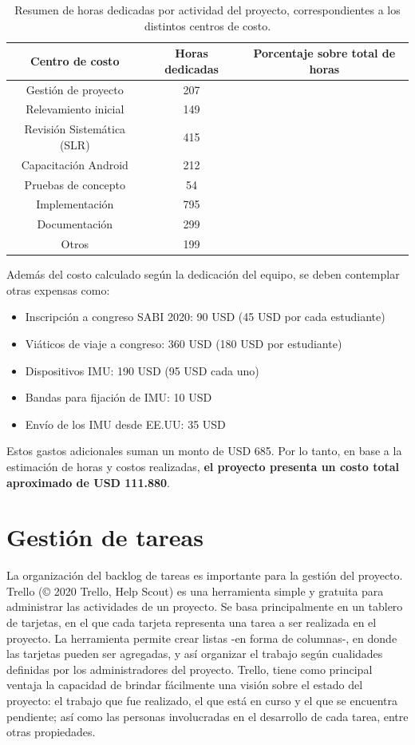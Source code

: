 \begin{table}[H]
\caption{Resumen de horas dedicadas por actividad del proyecto, correspondientes a los distintos centros de costo.}
\centering
\hspace*{-2.5cm}%
\begin{tabular}{|c|c|c|}
\hline
\textbf{Centro de costo} & \textbf{Horas dedicadas} & \textbf{Porcentaje sobre total de horas} \\ \hline
Gestión de proyecto & 207 \\ \hline
Relevamiento inicial & 149 \\ \hline
Revisión Sistemática (SLR) & 415 \\ \hline
Capacitación Android & 212 \\ \hline
Pruebas de concepto	& 54 \\ \hline
Implementación & 795 \\ \hline
Documentación & 299 \\ \hline
Otros & 199 \\ \hline
\end{tabular}
\hspace*{-1cm}
\label{TAB:expenses}
\end{table}


Además del costo calculado según la dedicación del equipo, se deben contemplar otras expensas como: 

\begin{itemize}
    \item Inscripción a congreso SABI 2020: 90 USD (45 USD por cada estudiante)
    \item Viáticos de viaje a congreso: 360 USD (180 USD por estudiante)
    \item Dispositivos IMU: 190 USD (95 USD cada uno) 
    \item Bandas para fijación de IMU: 10 USD
    \item Envío de los IMU desde EE.UU: 35 USD
\end{itemize}

Estos gastos adicionales suman un monto de USD 685. Por lo tanto, en base a la estimación de horas y costos realizadas, \textbf{el proyecto presenta un costo total aproximado de USD 111.880}.

\section{Gestión de tareas}
La organización del \gls{backlog} de tareas es importante para la gestión del proyecto. Trello (© 2020 Trello, Help Scout) es una herramienta simple y gratuita para administrar las actividades de un proyecto. Se basa principalmente en un tablero de tarjetas, en el que cada tarjeta representa una tarea a ser realizada en el proyecto. La herramienta permite crear listas -en forma de columnas-, en donde las tarjetas pueden ser agregadas, y así organizar el trabajo según cualidades definidas por los administradores del proyecto. Trello, tiene como principal ventaja la capacidad de brindar fácilmente una visión sobre el estado del proyecto: el trabajo que fue realizado, el que está en curso y el que se encuentra pendiente; así como las personas involucradas en el desarrollo de cada tarea, entre otras propiedades. 

